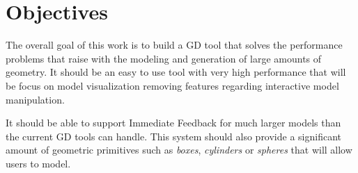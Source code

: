 
% 
% 

\section{Objectives}
\label{sec:objectives}



The overall goal of this work is to build a GD tool that solves the performance problems that raise with the modeling and generation of large amounts of geometry. It should be an easy to use tool with very high performance that will be focus on model visualization removing features regarding interactive model manipulation.

It should be able to support Immediate Feedback for much larger models than the current GD tools can handle. This system should also provide a significant amount of geometric primitives such as \emph{boxes}, \emph{cylinders} or \emph{spheres} that will allow users to model.


